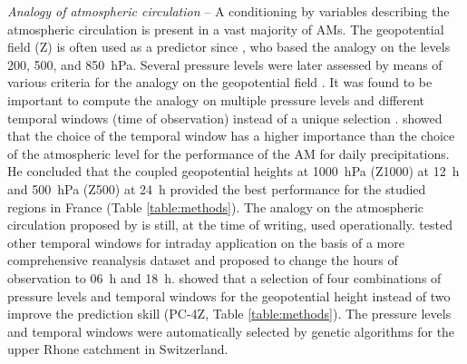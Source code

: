 \documentclass[review]{elsarticle}
\begin{document}
\textit{Analogy of atmospheric circulation} -- A conditioning by variables describing the atmospheric circulation is present in a vast majority of AMs. The geopotential field (Z) is often used as a predictor since \citet{Lorenz1969}, who based the analogy on the levels 200, 500, and 850~hPa. Several pressure levels were later assessed by means of various criteria for the analogy on the geopotential field \citep{Duband1970, Duband1974, Duband1981, Guilbaud1997}. It was found to be important to compute the analogy on multiple pressure levels and different temporal windows (time of observation) instead of a unique selection \citep{Guilbaud1998, Obled2002}. \citet{Bontron2004} showed that the choice of the temporal window has a higher importance than the choice of the atmospheric level for the performance of the AM for daily precipitations. He concluded that the coupled geopotential heights at 1000~hPa (Z1000) at 12~h and 500~hPa (Z500) at 24~h provided the best performance \citep[for a subset of the NCEP/NCAR Reanalysis I;][]{Kalnay1996, Kistler2001} for the studied regions in France (Table \ref{table:methods}). The analogy on the atmospheric circulation proposed by \citet{Bontron2004} is still, at the time of writing, used operationally. \citet{Marty2010} tested other temporal windows for intraday application on the basis of a more comprehensive reanalysis dataset and proposed to change the hours of observation to 06~h and 18~h. \citet{Horton2018a} showed that a selection of four combinations of pressure levels and temporal windows for the geopotential height instead of two improve the prediction skill (PC-4Z, Table \ref{table:methods}). The pressure levels and temporal windows were automatically selected by genetic algorithms for the upper Rhone catchment in Switzerland.
\end{document}
